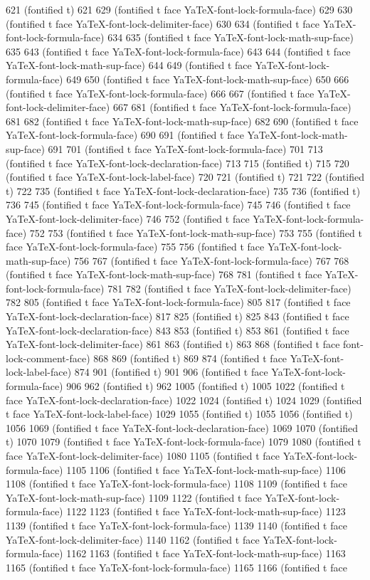621 (fontified t) 621 629 (fontified t face YaTeX-font-lock-formula-face) 629 630 (fontified t face YaTeX-font-lock-delimiter-face) 630 634 (fontified t face YaTeX-font-lock-formula-face) 634 635 (fontified t face YaTeX-font-lock-math-sup-face) 635 643 (fontified t face YaTeX-font-lock-formula-face) 643 644 (fontified t face YaTeX-font-lock-math-sup-face) 644 649 (fontified t face YaTeX-font-lock-formula-face) 649 650 (fontified t face YaTeX-font-lock-math-sup-face) 650 666 (fontified t face YaTeX-font-lock-formula-face) 666 667 (fontified t face YaTeX-font-lock-delimiter-face) 667 681 (fontified t face YaTeX-font-lock-formula-face) 681 682 (fontified t face YaTeX-font-lock-math-sup-face) 682 690 (fontified t face YaTeX-font-lock-formula-face) 690 691 (fontified t face YaTeX-font-lock-math-sup-face) 691 701 (fontified t face YaTeX-font-lock-formula-face) 701 713 (fontified t face YaTeX-font-lock-declaration-face) 713 715 (fontified t) 715 720 (fontified t face YaTeX-font-lock-label-face) 720 721 (fontified t) 721 722 (fontified t) 722 735 (fontified t face YaTeX-font-lock-declaration-face) 735 736 (fontified t) 736 745 (fontified t face YaTeX-font-lock-formula-face) 745 746 (fontified t face YaTeX-font-lock-delimiter-face) 746 752 (fontified t face YaTeX-font-lock-formula-face) 752 753 (fontified t face YaTeX-font-lock-math-sup-face) 753 755 (fontified t face YaTeX-font-lock-formula-face) 755 756 (fontified t face YaTeX-font-lock-math-sup-face) 756 767 (fontified t face YaTeX-font-lock-formula-face) 767 768 (fontified t face YaTeX-font-lock-math-sup-face) 768 781 (fontified t face YaTeX-font-lock-formula-face) 781 782 (fontified t face YaTeX-font-lock-delimiter-face) 782 805 (fontified t face YaTeX-font-lock-formula-face) 805 817 (fontified t face YaTeX-font-lock-declaration-face) 817 825 (fontified t) 825 843 (fontified t face YaTeX-font-lock-declaration-face) 843 853 (fontified t) 853 861 (fontified t face YaTeX-font-lock-delimiter-face) 861 863 (fontified t) 863 868 (fontified t face font-lock-comment-face) 868 869 (fontified t) 869 874 (fontified t face YaTeX-font-lock-label-face) 874 901 (fontified t) 901 906 (fontified t face YaTeX-font-lock-formula-face) 906 962 (fontified t) 962 1005 (fontified t) 1005 1022 (fontified t face YaTeX-font-lock-declaration-face) 1022 1024 (fontified t) 1024 1029 (fontified t face YaTeX-font-lock-label-face) 1029 1055 (fontified t) 1055 1056 (fontified t) 1056 1069 (fontified t face YaTeX-font-lock-declaration-face) 1069 1070 (fontified t) 1070 1079 (fontified t face YaTeX-font-lock-formula-face) 1079 1080 (fontified t face YaTeX-font-lock-delimiter-face) 1080 1105 (fontified t face YaTeX-font-lock-formula-face) 1105 1106 (fontified t face YaTeX-font-lock-math-sup-face) 1106 1108 (fontified t face YaTeX-font-lock-formula-face) 1108 1109 (fontified t face YaTeX-font-lock-math-sup-face) 1109 1122 (fontified t face YaTeX-font-lock-formula-face) 1122 1123 (fontified t face YaTeX-font-lock-math-sup-face) 1123 1139 (fontified t face YaTeX-font-lock-formula-face) 1139 1140 (fontified t face YaTeX-font-lock-delimiter-face) 1140 1162 (fontified t face YaTeX-font-lock-formula-face) 1162 1163 (fontified t face YaTeX-font-lock-math-sup-face) 1163 1165 (fontified t face YaTeX-font-lock-formula-face) 1165 1166 (fontified t face 